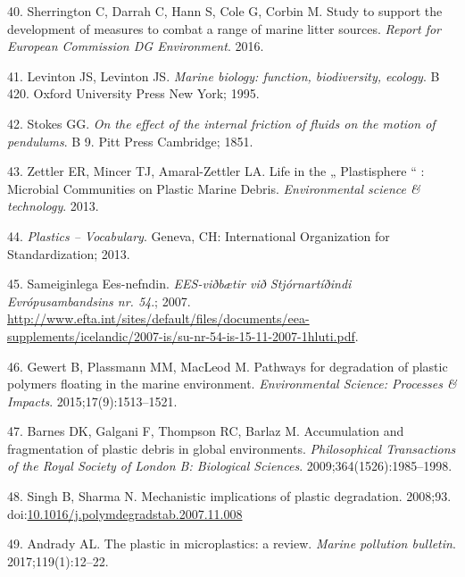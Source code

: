 \documentclass[icelandic,]{book}
\begin{document}
\leavevmode\hypertarget{ref-sherrington2016study}{}%
40. Sherrington C, Darrah C, Hann S, Cole G, Corbin M. Study to support the development of measures to combat a range of marine litter sources. \emph{Report for European Commission DG Environment}. 2016.

\leavevmode\hypertarget{ref-levinton1995marine}{}%
41. Levinton JS, Levinton JS. \emph{Marine biology: function, biodiversity, ecology}. B 420. Oxford University Press New York; 1995.

\leavevmode\hypertarget{ref-stokes1851effect}{}%
42. Stokes GG. \emph{On the effect of the internal friction of fluids on the motion of pendulums}. B 9. Pitt Press Cambridge; 1851.

\leavevmode\hypertarget{ref-Zettler2013}{}%
43. Zettler ER, Mincer TJ, Amaral-Zettler LA. Life in the „ Plastisphere `` : Microbial Communities on Plastic Marine Debris. \emph{Environmental science \& technology}. 2013.

\leavevmode\hypertarget{ref-ISO472}{}%
44. \emph{Plastics -- Vocabulary}. Geneva, CH: International Organization for Standardization; 2013.

\leavevmode\hypertarget{ref-SameiginlegaEes-nefndin2007}{}%
45. Sameiginlega Ees-nefndin. \emph{EES-viðbætir við Stjórnartíðindi Evrópusambandsins nr. 54}.; 2007. \url{http://www.efta.int/sites/default/files/documents/eea-supplements/icelandic/2007-is/su-nr-54-is-15-11-2007-1hluti.pdf}.

\leavevmode\hypertarget{ref-gewert2015pathways}{}%
46. Gewert B, Plassmann MM, MacLeod M. Pathways for degradation of plastic polymers floating in the marine environment. \emph{Environmental Science: Processes \& Impacts}. 2015;17(9):1513--1521.

\leavevmode\hypertarget{ref-barnes2009accumulation}{}%
47. Barnes DK, Galgani F, Thompson RC, Barlaz M. Accumulation and fragmentation of plastic debris in global environments. \emph{Philosophical Transactions of the Royal Society of London B: Biological Sciences}. 2009;364(1526):1985--1998.

\leavevmode\hypertarget{ref-Singh2008}{}%
48. Singh B, Sharma N. Mechanistic implications of plastic degradation. 2008;93. doi:\href{https://doi.org/10.1016/j.polymdegradstab.2007.11.008}{10.1016/j.polymdegradstab.2007.11.008}

\leavevmode\hypertarget{ref-andrady2017plastic}{}%
49. Andrady AL. The plastic in microplastics: a review. \emph{Marine pollution bulletin}. 2017;119(1):12--22.
\end{document}
